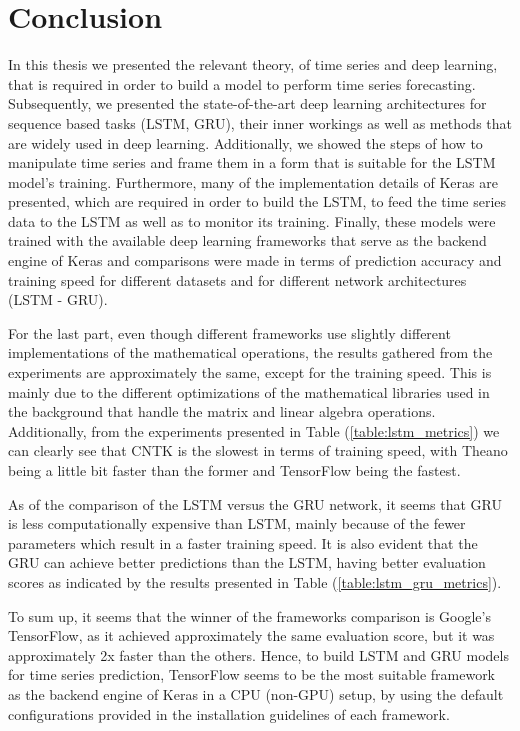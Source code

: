 \documentclass[a4paper, 12pt]{article}
\numberwithin{equation}{section}
\numberwithin{figure}{section}
\numberwithin{table}{section}
\begin{document}
	\newpage

	\section{Conclusion}
	
	In this thesis we presented the relevant theory, of time series and deep learning, that is required in order to build a model to perform time series forecasting.
	Subsequently, we presented the state-of-the-art deep learning architectures for sequence based tasks (LSTM, GRU), their inner workings as well as methods that are widely used in deep learning.
	Additionally, we showed the steps of how to manipulate time series and frame them in a form that is suitable for the LSTM model's training.
	Furthermore, many of the implementation details of Keras are presented, which are required in order to build the LSTM, to feed the time series data to the LSTM as well as to monitor its training.
	Finally, these models were trained with the available deep learning frameworks that serve as the backend engine of Keras and comparisons were made in terms of prediction accuracy and training speed for different datasets and for different network architectures (LSTM - GRU).\par
	
	For the last part, even though different frameworks use slightly different implementations of the mathematical operations, the results gathered from the experiments are approximately the same, except for the training speed. This is mainly due to the different optimizations of the mathematical libraries used in the background that handle the matrix and linear algebra operations. Additionally, from the experiments presented in Table (\ref{table:lstm_metrics}) we can clearly see that CNTK is the slowest in terms of training speed, with Theano being a little bit faster than the former and TensorFlow being the fastest.\par
	
	As of the comparison of the LSTM versus the GRU network, it seems that GRU is less computationally expensive than LSTM, mainly because of the fewer parameters which result in a faster training speed. It is also evident that the GRU can achieve better predictions than the LSTM, having better evaluation scores as indicated by the results presented in Table (\ref{table:lstm_gru_metrics}).\par
	
	To sum up, it seems that the winner of the frameworks comparison is Google's TensorFlow, as it achieved approximately the same evaluation score, but it was approximately 2x faster than the others. Hence, to build LSTM and GRU models for time series prediction, TensorFlow seems to be the most suitable framework as the backend engine of Keras in a CPU (non-GPU) setup, by using the default configurations provided in the installation guidelines of each framework.
	
	\newpage
	
	\nocite{*}
	
	
	
	
\end{document}

